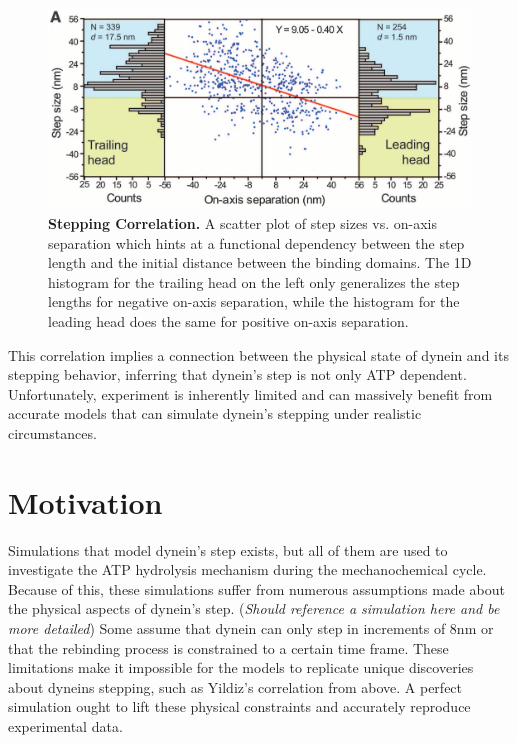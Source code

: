 \begin{figure}[H]
	\centering
	\includegraphics[width=1\columnwidth]{Figures/Yildiz_stepping.png}
	\caption[Stepping Correlation]{\textbf{Stepping Correlation.} A scatter plot of step sizes vs. on-axis separation which hints at a functional dependency between the step  length and the initial distance between the binding domains. The 1D histogram for the trailing head on the left only generalizes the step lengths for negative on-axis separation, while the histogram for the leading head does the same for positive on-axis separation. \cite{Dewitt2012} }
	\label{fig:YildizCorrelation}
\end{figure}

This correlation implies a connection between the physical state of dynein and its stepping behavior, inferring that dynein's step is not only ATP dependent. Unfortunately, experiment is inherently limited and can massively benefit from accurate models that can simulate dynein's stepping under realistic circumstances.


\section{Motivation}

Simulations that model dynein's step exists, but all of them are used to investigate the ATP hydrolysis mechanism during the mechanochemical cycle. Because of this, these simulations suffer from numerous assumptions made about the physical aspects of dynein's step. (\textit{Should reference a simulation here and be more detailed}) Some assume that dynein can only step in increments of 8nm or that the rebinding process is constrained to a certain time frame. These limitations make it impossible for the models to replicate unique discoveries about dyneins stepping, such as Yildiz's correlation from above. A perfect simulation ought to lift these physical constraints and accurately reproduce experimental data.

